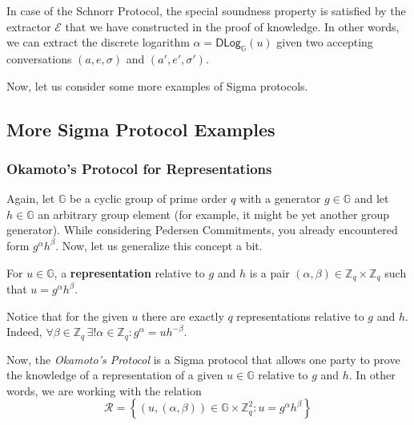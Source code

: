 \documentclass[../lecture-notes.tex]{subfiles}
\begin{document}
\begin{example}
    In case of the Schnorr Protocol, the special soundness property is satisfied by the extractor $\mathcal{E}$ that we have constructed in the proof of knowledge. In other words, we can extract the discrete logarithm $\alpha = \mathsf{DLog}_{\mathbb{G}}(u)$ given two accepting conversations $(a,e,\sigma)$ and $(a',e',\sigma')$.
\end{example}

Now, let us consider some more examples of Sigma protocols.

\subsection{More Sigma Protocol Examples}

\subsubsection{Okamoto's Protocol for Representations}

Again, let $\mathbb{G}$ be a cyclic group of prime order $q$ with a generator $g \in \mathbb{G}$ and let $h \in \mathbb{G}$ an arbitrary group element (for example, it might be yet another group generator). While considering Pedersen Commitments, you already encountered form $g^{\alpha}h^{\beta}$. Now, let us generalize this concept a bit.

\begin{definition}
    For $u \in \mathbb{G}$, a \textbf{representation} relative to $g$ and $h$ is a pair $(\alpha,\beta) \in \mathbb{Z}_q \times \mathbb{Z}_q$ such that $u=g^{\alpha}h^{\beta}$.
\end{definition}

\begin{remark}
    Notice that for the given $u$ there are exactly $q$ representations relative to $g$ and $h$. Indeed, $\forall \beta \in \mathbb{Z}_q \, \exists! \alpha \in \mathbb{Z}_q: g^{\alpha} = uh^{-\beta}$. 
\end{remark}

Now, the \textit{Okamoto's Protocol} is a Sigma protocol that allows one party to prove the knowledge of a representation of a given $u \in \mathbb{G}$ relative to $g$ and $h$. In other words, we are working with the relation
\begin{equation*}
    \mathcal{R} = \left\{ (u,(\alpha,\beta)) \in \mathbb{G} \times \mathbb{Z}_q^2: u = g^{\alpha}h^{\beta} \right\}
\end{equation*}
\end{document}
